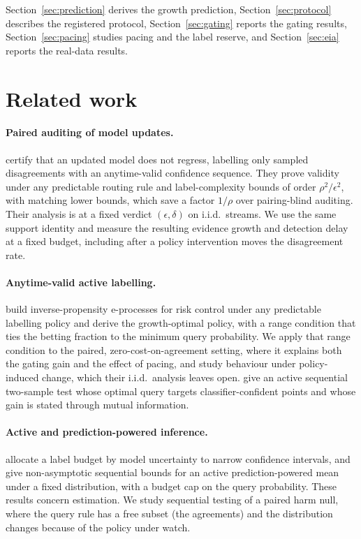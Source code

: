 Section~\ref{sec:prediction} derives the growth prediction, Section~\ref{sec:protocol} describes the registered protocol, Section~\ref{sec:gating} reports the gating results,
Section~\ref{sec:pacing} studies pacing and the label reserve, and Section~\ref{sec:eia} reports the real-data results.

\section{Related work}\label{sec:related}

\paragraph{Paired auditing of model updates.}
\citet{discern} certify that an updated model does not regress, labelling only sampled disagreements with an anytime-valid confidence sequence.
They prove validity under any predictable routing rule and label-complexity bounds of order $\rho^2/\epsilon^2$, with matching lower bounds, which save a factor $1/\rho$ over pairing-blind auditing.
Their analysis is at a fixed verdict $(\epsilon,\delta)$ on i.i.d.\ streams. We use the same support identity and measure the resulting evidence growth and detection delay at a fixed budget,
including after a policy intervention moves the disagreement rate.

\paragraph{Anytime-valid active labelling.}
\citet{xu2024active} build inverse-propensity e-processes for risk control under any predictable labelling policy and derive the growth-optimal policy,
with a range condition that ties the betting fraction to the minimum query probability. We apply that range condition to the paired, zero-cost-on-agreement setting,
where it explains both the gating gain and the effect of pacing, and study behaviour under policy-induced change, which their i.i.d.\ analysis leaves open.
\citet{active2sample} give an active sequential two-sample test whose optimal query targets classifier-confident points and whose gain is stated through mutual information.

\paragraph{Active and prediction-powered inference.}
\citet{zrnic2024active} allocate a label budget by model uncertainty to narrow confidence intervals, and \citet{sfyraki2026} give non-asymptotic sequential bounds
for an active prediction-powered mean under a fixed distribution, with a budget cap on the query probability. These results concern estimation. We study sequential testing
of a paired harm null, where the query rule has a free subset (the agreements) and the distribution changes because of the policy under watch.

